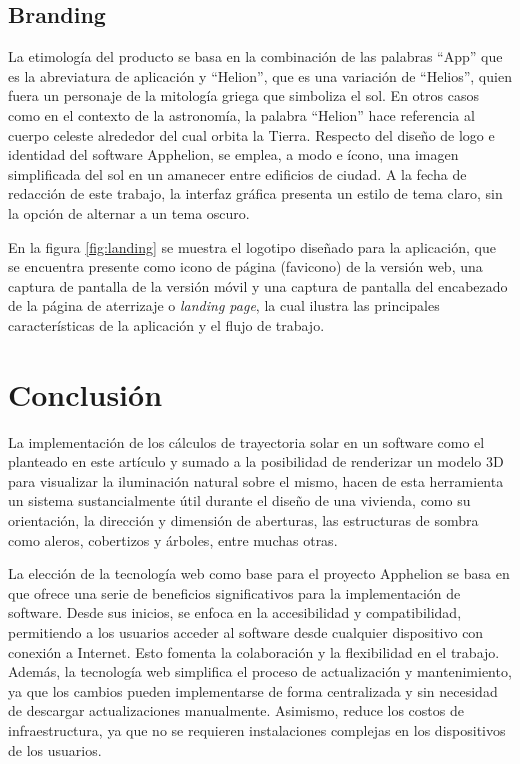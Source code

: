 \documentclass[a4paper]{article}
\begin{document}
\subsection{Branding}
La etimología del producto se basa en la combinación de las palabras ``App'' que es la abreviatura de aplicación y ``Helion'', que es una variación de ``Helios'', quien fuera un personaje de la mitología griega que simboliza el sol. En otros casos como en el contexto de la astronomía, la palabra ``Helion'' hace referencia al cuerpo celeste alrededor del cual orbita la Tierra. Respecto del diseño de logo e identidad del software Apphelion, se emplea, a modo e ícono, una imagen simplificada del sol en un amanecer entre edificios de ciudad. A la fecha de redacción de este trabajo, la interfaz gráfica presenta un estilo de tema claro, sin la opción de alternar a un tema oscuro.

En la figura \ref{fig:landing} se muestra el logotipo diseñado para la aplicación, que se encuentra presente como icono de página (favicono) de la versión web, una captura de pantalla de la versión móvil y una captura de pantalla del encabezado de la página de aterrizaje o \textit{landing page}, la cual ilustra las principales características de la aplicación y el flujo de trabajo.

\section{Conclusión}
La implementación de los cálculos de trayectoria solar en un software como el planteado en este artículo y sumado a la posibilidad de renderizar un modelo 3D para visualizar la iluminación natural sobre el mismo, hacen de esta herramienta un sistema sustancialmente útil durante el diseño de una vivienda, como su orientación, la dirección y dimensión de aberturas, las estructuras de sombra como aleros, cobertizos y árboles, entre muchas otras.

La elección de la tecnología web como base para el proyecto Apphelion se basa en que ofrece una serie de beneficios significativos para la implementación de software. Desde sus inicios, se enfoca en la accesibilidad y compatibilidad, permitiendo a los usuarios acceder al software desde cualquier dispositivo con conexión a Internet. Esto fomenta la colaboración y la flexibilidad en el trabajo. Además, la tecnología web simplifica el proceso de actualización y mantenimiento, ya que los cambios pueden implementarse de forma centralizada y sin necesidad de descargar actualizaciones manualmente. Asimismo, reduce los costos de infraestructura, ya que no se requieren instalaciones complejas en los dispositivos de los usuarios.
\end{document}
